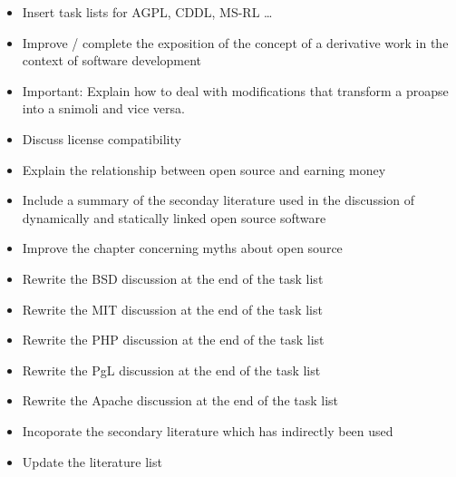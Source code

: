 \begin{footnotesize}
\begin{itemize}
  \item Insert task lists for AGPL, CDDL, MS-RL \ldots
  \item Improve / complete the exposition of the concept of a derivative work
    in the context of software development
  \item Important: Explain how to deal with modifications that transform
    a proapse into a snimoli and vice versa.
  \item Discuss license compatibility
  \item Explain the relationship between open source and earning money
  \item Include a summary of the seconday literature used in the
    discussion of dynamically and statically linked open source
    software 
  \item Improve the chapter concerning myths about open source
  \item Rewrite the BSD discussion at the end of the task list 
  \item Rewrite the MIT discussion at the end of the task list
  \item Rewrite the PHP discussion at the end of the task list
  \item Rewrite the PgL discussion at the end of the task list
  \item Rewrite the Apache discussion at the end of the task list
  \item Incoporate the secondary literature which has indirectly been used
  \item Update the literature list
\end{itemize}
\end{footnotesize}

%

